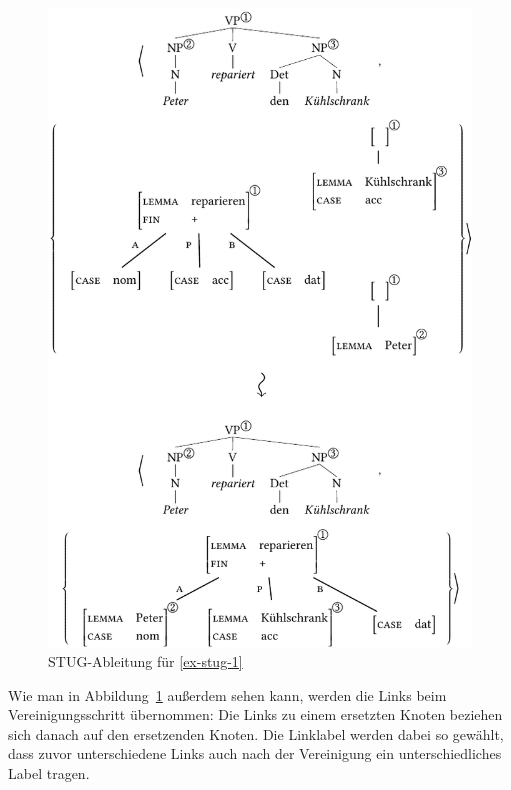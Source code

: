 \begin{figure}[t]
\centering
\includegraphics{graphics/abb94.pdf}
\caption{\label{fig-stug-4}STUG-Ableitung für \ref{ex-stug-1}}
\end{figure}

Wie man in Abbildung~\ref{fig-stug-4} au\ss erdem sehen kann, werden die Links beim Vereinigungsschritt übernommen: Die Links zu einem ersetzten Knoten beziehen sich danach auf den ersetzenden Knoten. Die Linklabel werden dabei so gewählt, dass zuvor unterschiedene Links auch nach der Vereinigung ein unterschiedliches Label tragen. 

